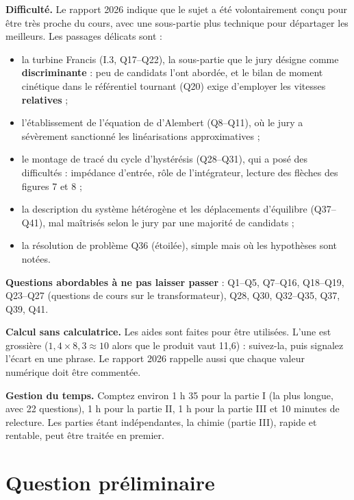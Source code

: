 \documentclass[11pt,a4paper]{article}
\providecommand{\tightlist}{\setlength{\itemsep}{0pt}\setlength{\parskip}{0pt}}
\begin{document}
\textbf{Difficulté.} Le rapport 2026 indique que le sujet a été volontairement conçu pour être très proche du cours, avec une sous-partie plus technique pour départager les meilleurs. Les passages délicats sont :

\begin{itemize}
\tightlist
\item
  la turbine Francis (I.3, Q17--Q22), la sous-partie que le jury désigne comme \textbf{discriminante} : peu de candidats l'ont abordée, et le bilan de moment cinétique dans le référentiel tournant (Q20) exige d'employer les vitesses \textbf{relatives} ;
\item
  l'établissement de l'équation de d'Alembert (Q8--Q11), où le jury a sévèrement sanctionné les linéarisations approximatives ;
\item
  le montage de tracé du cycle d'hystérésis (Q28--Q31), qui a posé des difficultés : impédance d'entrée, rôle de l'intégrateur, lecture des flèches des figures 7 et 8 ;
\item
  la description du système hétérogène et les déplacements d'équilibre (Q37--Q41), mal maîtrisés selon le jury par une majorité de candidats ;
\item
  la résolution de problème Q36 (étoilée), simple mais où les hypothèses sont notées.
\end{itemize}

\textbf{Questions abordables à ne pas laisser passer} : Q1--Q5, Q7--Q16, Q18--Q19, Q23--Q27 (questions de cours sur le transformateur), Q28, Q30, Q32--Q35, Q37, Q39, Q41.

\textbf{Calcul sans calculatrice.} Les aides sont faites pour être utilisées. L'une est grossière (\(1{,}4\times8{,}3\approx10\) alors que le produit vaut 11,6) : suivez-la, puis signalez l'écart en une phrase. Le rapport 2026 rappelle aussi que chaque valeur numérique doit être commentée.

\textbf{Gestion du temps.} Comptez environ 1 h 35 pour la partie I (la plus longue, avec 22 questions), 1 h pour la partie II, 1 h pour la partie III et 10 minutes de relecture. Les parties étant indépendantes, la chimie (partie III), rapide et rentable, peut être traitée en premier.

\hypertarget{question-pruxe9liminaire}{%
\section{Question préliminaire}\label{question-pruxe9liminaire}}
\end{document}
